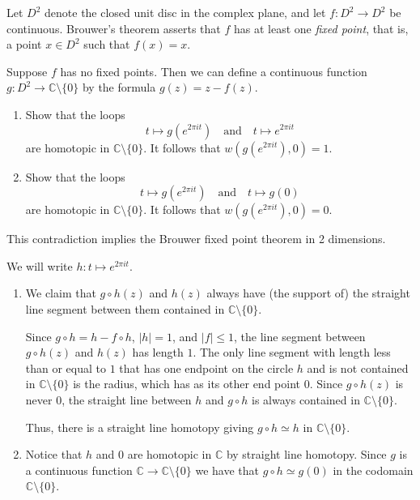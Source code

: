 \documentclass[12 pt, letterpaper]{hmcpset}
\begin{document}
\begin{problem}
	Let $D^{2}$ denote the closed unit disc in the complex plane, and let $f : D^{2} \to D^{2}$ be continuous. Brouwer's theorem asserts that $f$ has at least one \emph{fixed point}, that is, a point $x \in D^{2}$ such that $f(x) = x$.

	Suppose $f$ has no fixed points. Then we can define a continuous function $g : D^{2} \to \mathbb{C} \setminus \{ 0 \}$ by the formula $g(z) = z - f(z)$.
	\begin{enumerate}
		\item Show that the loops
			\[
				t \mapsto g(e^{2 \pi i t}) \quad \text{and} \quad t \mapsto e^{2 \pi i t}
			\]
			are homotopic in $\mathbb{C} \setminus \{ 0 \}$. It follows that $w(g(e^{2 \pi i t}), 0) = 1$.
		\item Show that the loops
			\[
				t \mapsto g(e^{2 \pi i t}) \quad \text{and} \quad t \mapsto g(0)
			\]
			are homotopic in $\mathbb{C} \setminus \{ 0 \}$. It follows that $w(g(e^{2 \pi i t}), 0) = 0$.
	\end{enumerate}
	This contradiction implies the Brouwer fixed point theorem in 2 dimensions.
\end{problem}

\begin{solution}
	We will write $h : t \mapsto e^{2 \pi i t}$.
	\begin{enumerate}
		\item We claim that $g \circ h(z)$ and $h(z)$ always have (the support of) the straight line segment between them contained in $\mathbb{C} \setminus \{ 0 \}$. 

			Since $g \circ h = h - f \circ h$, $\lvert h \rvert = 1$, and $\lvert f \rvert \le 1$, the line segment between  $g \circ h(z)$ and $h(z)$ has length $1$. The only line segment with length less than or equal to $1$ that has one endpoint on the circle $h$ and is not contained in $\mathbb{C} \setminus \{ 0 \}$ is the radius, which has as its other end point $0$. Since $g \circ h(z)$ is never $0$, the straight line between $h$ and $g \circ h$ is always contained in $\mathbb{C} \setminus \{ 0 \}$.

			Thus, there is a straight line homotopy giving $g \circ h \simeq h$ in $\mathbb{C} \setminus \{ 0 \}$.

		\item Notice that $h$ and $0$ are homotopic in $\mathbb{C}$ by straight line homotopy. Since $g$ is a continuous function $\mathbb{C} \to \mathbb{C} \setminus \{ 0 \}$ we have that $g \circ h \simeq g(0)$ in the codomain $\mathbb{C} \setminus \{ 0 \}$.
	\end{enumerate}
\end{solution}
\end{document}
